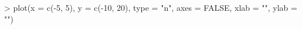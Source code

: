 \begin{Schunk}
\begin{Sinput}
> plot(x = c(-5, 5), y = c(-10, 20), type = "n", axes = FALSE, xlab = "", ylab = "")
\end{Sinput}
\end{Schunk}
